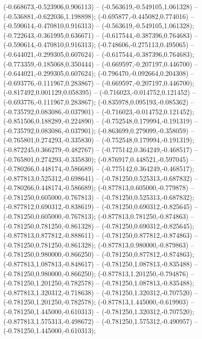  (-0.668673,-0.523906,0.906113) -- (-0.563619,-0.549105,1.061328) -- (-0.536881,-0.622036,1.198898);
 (-0.695877,-0.445082,0.774016) -- (-0.590614,-0.470810,0.916313) -- (-0.563619,-0.549105,1.061328);
 (-0.722643,-0.361995,0.636671) -- (-0.617544,-0.387396,0.764683) -- (-0.590614,-0.470810,0.916313);
 (-0.748606,-0.275113,0.495065) -- (-0.644021,-0.299305,0.607624) -- (-0.617544,-0.387396,0.764683);
 (-0.773359,-0.185068,0.350444) -- (-0.669597,-0.207197,0.446700) -- (-0.644021,-0.299305,0.607624);
 (-0.796470,-0.092664,0.204308) -- (-0.693776,-0.111967,0.283867) -- (-0.669597,-0.207197,0.446700);
 (-0.817492,0.001129,0.058395) -- (-0.716023,-0.014752,0.121452) -- (-0.693776,-0.111967,0.283867);
 (-0.835978,0.095193,-0.085362) -- (-0.735792,0.083086,-0.037901) -- (-0.716023,-0.014752,0.121452);
 (-0.851506,0.188289,-0.224890) -- (-0.752548,0.179994,-0.191319) -- (-0.735792,0.083086,-0.037901);
 (-0.863699,0.279099,-0.358059) -- (-0.765801,0.274293,-0.335830) -- (-0.752548,0.179994,-0.191319);
 (-0.872245,0.366279,-0.482767) -- (-0.775142,0.364249,-0.468517) -- (-0.765801,0.274293,-0.335830);
 (-0.876917,0.448521,-0.597045) -- (-0.780266,0.448174,-0.586689) -- (-0.775142,0.364249,-0.468517);
 (-0.877813,0.525312,-0.698641) -- (-0.781250,0.525313,-0.687832) -- (-0.780266,0.448174,-0.586689);
 (-0.877813,0.605000,-0.779878) -- (-0.781250,0.605000,-0.767813) -- (-0.781250,0.525313,-0.687832);
 (-0.877812,0.690312,-0.838619) -- (-0.781250,0.690312,-0.825645) -- (-0.781250,0.605000,-0.767813);
 (-0.877813,0.781250,-0.874863) -- (-0.781250,0.781250,-0.861328) -- (-0.781250,0.690312,-0.825645);
 (-0.877813,0.877812,-0.888611) -- (-0.781250,0.877812,-0.874863) -- (-0.781250,0.781250,-0.861328);
 (-0.877813,0.980000,-0.879863) -- (-0.781250,0.980000,-0.866250) -- (-0.781250,0.877812,-0.874863);
 (-0.877813,1.087813,-0.848617) -- (-0.781250,1.087813,-0.835488) -- (-0.781250,0.980000,-0.866250);
 (-0.877813,1.201250,-0.794876) -- (-0.781250,1.201250,-0.782578) -- (-0.781250,1.087813,-0.835488);
 (-0.877813,1.320312,-0.718638) -- (-0.781250,1.320312,-0.707520) -- (-0.781250,1.201250,-0.782578);
 (-0.877813,1.445000,-0.619903) -- (-0.781250,1.445000,-0.610313) -- (-0.781250,1.320312,-0.707520);
 (-0.877813,1.575313,-0.498672) -- (-0.781250,1.575312,-0.490957) -- (-0.781250,1.445000,-0.610313);
